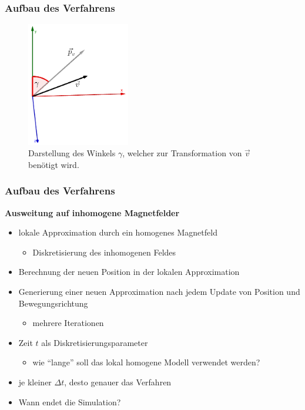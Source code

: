 \begin{frame}
  \frametitle{Aufbau des Verfahrens}
  \begin{figure}
    \centering
    \includegraphics[width=0.4\textwidth]{../geogebra/img/winkel_v_edited}
    \caption{Darstellung des Winkels \(\gamma\), welcher zur Transformation von \(\vec{v}\) ben\"otigt wird.}
    \label{fig:winkelv}
  \end{figure}
\end{frame}

\begin{frame}
  \frametitle{Aufbau des Verfahrens}
  \onslide<+->
  \textbf{Ausweitung auf inhomogene Magnetfelder}
  \begin{itemize}
    \item<+-> lokale Approximation durch ein homogenes Magnetfeld
      \begin{itemize}
        \item<+-> Diskretisierung des inhomogenen Feldes
      \end{itemize}
    \item<+-> Berechnung der neuen Position in der lokalen Approximation
    \item<+-> Generierung einer neuen Approximation nach jedem Update von Position und Bewegungsrichtung
      \begin{itemize}
        \item<+-> mehrere Iterationen
      \end{itemize}
    \item<+-> Zeit \(t\) als Diskretisierungsparameter
      \begin{itemize}
        \item<+-> wie "`lange"' soll das lokal homogene Modell verwendet werden?
      \end{itemize}
    \item<+-> je kleiner \(\Delta t\), desto genauer das Verfahren
    \item<+-> Wann endet die Simulation?
  \end{itemize}
\end{frame}

